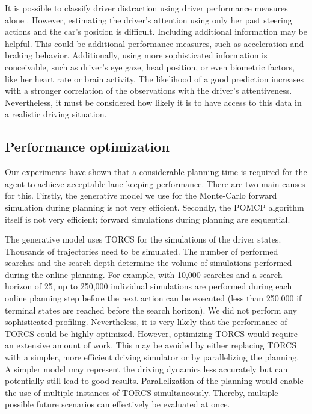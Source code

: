 It is possible to classify driver distraction using driver performance measures alone \parencite{dist-det-perf}. However, estimating the driver's attention using only her past steering actions and the car's position is difficult. Including additional information may be helpful. This could be additional performance measures, such as acceleration and braking behavior. Additionally, using more sophisticated information is conceivable, such as driver's eye gaze, head position, or even biometric factors, like her heart rate or brain activity. The likelihood of a good prediction increases with a stronger correlation of the observations with the driver's attentiveness. Nevertheless, it must be considered how likely it is to have access to this data in a realistic driving situation.

\subsection{Performance optimization}
\label{sec:perf_opt}

Our experiments have shown that a considerable planning time is required for the agent to achieve acceptable lane-keeping performance. There are two main causes for this. Firstly, the generative model we use for the Monte-Carlo forward simulation during planning is not very efficient. Secondly, the POMCP algorithm itself is not very efficient; forward simulations during planning are sequential.

The generative model uses TORCS for the simulations of the driver states. Thousands of trajectories need to be simulated. The number of performed searches and the search depth determine the volume of simulations performed during the online planning. For example, with 10,000 searches and a search horizon of 25, up to 250,000 individual simulations are performed during each online planning step before the next action can be executed (less than 250.000 if terminal states are reached before the search horizon). We did not perform any sophisticated profiling. Nevertheless, it is very likely that the performance of TORCS could be highly optimized. However, optimizing TORCS would require an extensive amount of work. This may be avoided by either replacing TORCS with a simpler, more efficient driving simulator or by parallelizing the planning. A simpler model may represent the driving dynamics less accurately but can potentially still lead to good results. Parallelization of the planning would enable the use of multiple instances of TORCS simultaneously. Thereby, multiple possible future scenarios can effectively be evaluated at once.

